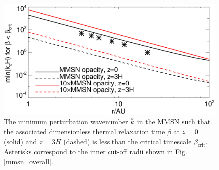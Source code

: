%  
% 
%
%

\begin{figure}
  \includegraphics[width=\linewidth]{figures/bcrit_mink} 
  \caption{The minimum perturbation wavenumber $\hat{k}$ in
    the MMSN such that the associated dimensionless thermal
    relaxation time $\beta$ at $z=0$ (solid) and $z=3H$ (dashed) is
    less than the critical timescale $\beta_\mathrm{crit}$. Asterisks
    correspond to the inner cut-off radii shown in
    Fig. \ref{mmsn_overall}.   
    \label{mmsn_bcrit_bcool_mink}}   
\end{figure}  

